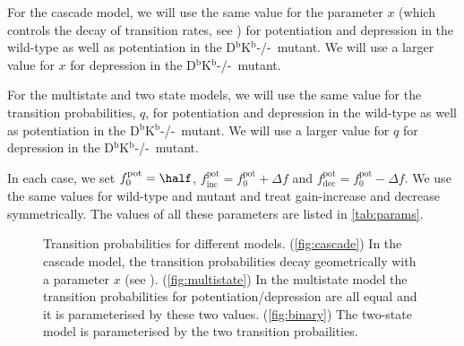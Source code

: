 \documentclass[12pt]{article}
\newcommand{\pot}{^{\text{pot}}}
\newcommand{\norm}{_0}
\newcommand{\inc}{_{\text{inc}}}
\newcommand{\dec}{_{\text{dec}}}
\newcommand{\KO}{D$^\mathrm{b}$K$^\mathrm{b}$-/-}
\begin{document}
For the cascade model, we will use the same value for the parameter $x$ (which controls the decay of transition rates, see \cite{Fusi2005cascade}) for potentiation and depression in the wild-type as well as potentiation in the \KO\ mutant.
We will use a larger value for $x$ for depression in the \KO\ mutant.

For the multistate and two state models, we will use the same value for the transition probabilities, $q$, for potentiation and depression in the wild-type as well as potentiation in the \KO\ mutant.
We will use a larger value for $q$ for depression in the \KO\ mutant.

In each case, we set $f\pot\norm=\half$, $f\pot\inc=f\pot\norm+\Delta f$ and $f\pot\dec=f\pot\norm-\Delta f$. 
We use the same values for wild-type and mutant and treat gain-increase and decrease symmetrically.
The values of all these parameters are listed in \autoref{tab:params}.

\begin{figure}
 \begin{center}
 \begin{myenuma}
  \item{}\label{fig:cascade}\hspace{0.5cm}
  \item{}\label{fig:multistate}\hspace{0.5cm}
  \item{}\label{fig:binary}
 \end{myenuma}
 \end{center}
  \caption{Transition probabilities for different models.
  (\ref{fig:cascade}) In the cascade model, the transition probabilities decay geometrically with a parameter $x$ (see \cite{Fusi2005cascade}).
  (\ref{fig:multistate}) In the multistate model the transition probabilities for potentiation/depression are all equal and it is parameterised by these two values.
  (\ref{fig:binary}) The two-state model is parameterised by the two transition probailities.} \label{fig:models}
\end{figure}
\end{document}
